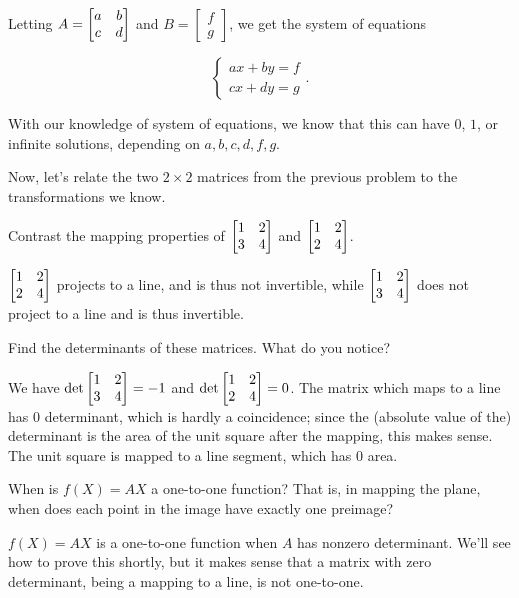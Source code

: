\documentclass[../gatm_answers.tex]{subfiles}
\begin{document}
Letting $A=\begin{bmatrix} a & b \\ c & d \end{bmatrix}$ and $B=\begin{bmatrix} f \\ g \end{bmatrix}$, we get the system of equations

$$\begin{cases} ax + by = f \\ cx+dy = g \end{cases}.$$

With our knowledge of system of equations, we know that this can have $0$, $1$, or infinite solutions, depending on $a,b,c,d,f,g$.

\begin{outer_problem}
\item Now, let's relate the two $2\times 2$ matrices from the previous problem to the transformations we know.
\end{outer_problem}

\begin{inner_problem}[start=1]
\item Contrast the mapping properties of $\begin{bmatrix} 1 & 2 \\ 3 & 4 \end{bmatrix}$ and $\begin{bmatrix} 1 & 2 \\ 2 & 4 \end{bmatrix}$.
\end{inner_problem}

$\begin{bmatrix} 1 & 2 \\ 2 & 4 \end{bmatrix}$ projects to a line, and is thus not invertible, while $\begin{bmatrix} 1 & 2 \\ 3 & 4 \end{bmatrix}$ does not project to a line and is thus invertible.

\begin{inner_problem}
\item Find the determinants of these matrices. What do you notice?
\end{inner_problem}

We have $\det \begin{bmatrix} 1 & 2 \\ 3 & 4 \end{bmatrix} = -1$ and $\det \begin{bmatrix} 1 & 2 \\ 2 & 4 \end{bmatrix}=0$. The matrix which maps to a line has $0$ determinant, which is hardly a coincidence; since the (absolute value of the) determinant is the area of the unit square after the mapping, this makes sense. The unit square is mapped to a line segment, which has $0$ area.

\begin{inner_problem}
\item When is $f(X)=AX$ a one-to-one function? That is, in mapping the plane, when does each point in the image have exactly one preimage?
\end{inner_problem}

$f(X)=AX$ is a one-to-one function when $A$ has nonzero determinant. We'll see how to prove this shortly, but it makes sense that a matrix with zero determinant, being a mapping to a line, is not one-to-one.
\end{document}
